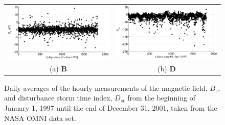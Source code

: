 \documentclass{article}[10pt]
\begin{document}
\begin{figure}[ht]
\begin{tabular}{cc}
\includegraphics[scale=0.48]{SolarExample_Bzdaily.eps} & \includegraphics[scale=0.48]{SolarExample_Ddaily.eps} \\
(a) $\bar{\mathbf{B}}$ & (b) $\bar{\mathbf{D}}$
\end{tabular}
\caption{Daily averages of the hourly measurements of the magnetic field, $B_z$, and disturbance storm time index, $D_{st}$ from the beginning of January 1, 1997 until the end of December 31, 2001, taken from the NASA OMNI data set.}
\label{fig:BzDstDAILYxyplot}
\end{figure}
\end{document}
